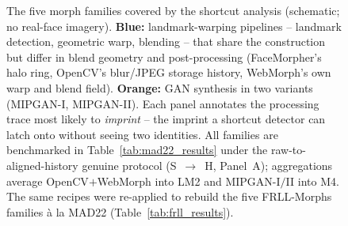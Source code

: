 \begin{figure}[t]
{}%
\captionsetup{hypcap=false}
\caption{The five morph families covered by the shortcut analysis (schematic; no real-face imagery).
\textbf{Blue:} landmark-warping pipelines -- landmark detection, geometric warp, blending -- that share the construction but differ in blend geometry and post-processing (FaceMorpher's halo ring, OpenCV's blur/JPEG storage history, WebMorph's own warp and blend field).
\textbf{Orange:} GAN synthesis in two variants (MIPGAN-I, MIPGAN-II).
Each panel annotates the processing trace most likely to \emph{imprint} -- the imprint a shortcut detector can latch onto without seeing two identities.
All families are benchmarked in Table~\ref{tab:mad22_results} under the raw-to-aligned-history genuine protocol (S~$\to$~H, Panel~A); aggregations average OpenCV$+$WebMorph into LM2 and MIPGAN-I$/$II into M4.
The same recipes were re-applied to rebuild the five FRLL-Morphs families \`a la MAD22 (Table~\ref{tab:frll_results}).}
\label{fig:families}
\end{figure}
